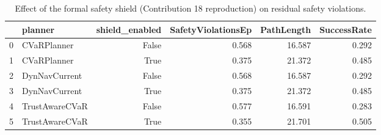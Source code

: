 \begin{table}
\caption{Effect of the formal safety shield (Contribution 18 reproduction) on residual safety violations.}
\label{tab:shield}
\begin{tabular}{llrrrr}
\toprule
 & planner & shield\_enabled & SafetyViolationsEp & PathLength & SuccessRate \\
\midrule
0 & CVaRPlanner & False & 0.568 & 16.587 & 0.292 \\
1 & CVaRPlanner & True & 0.375 & 21.372 & 0.485 \\
2 & DynNavCurrent & False & 0.568 & 16.587 & 0.292 \\
3 & DynNavCurrent & True & 0.375 & 21.372 & 0.485 \\
4 & TrustAwareCVaR & False & 0.577 & 16.591 & 0.283 \\
5 & TrustAwareCVaR & True & 0.355 & 21.701 & 0.505 \\
\bottomrule
\end{tabular}
\end{table}
